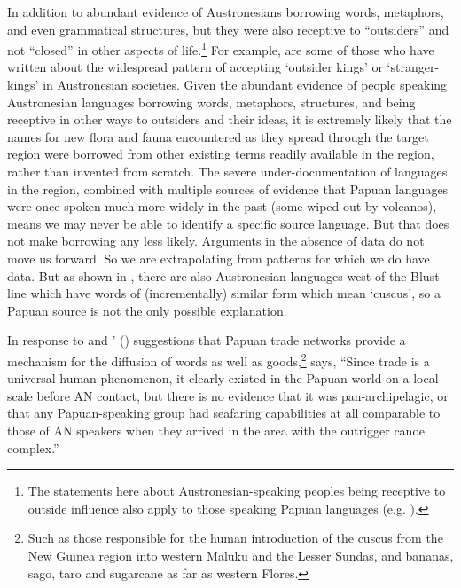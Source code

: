 In addition to abundant evidence of Austronesians borrowing
words, metaphors, and even grammatical structures,
but they were also receptive to ``outsiders''
and not ``closed'' in other aspects of life.\footnote{
		The statements here about Austronesian-speaking peoples
		being receptive to outside influence also apply to those
		speaking Papuan languages (e.g. \citealp{Schapper2011-BunakHistory}).}
For example,
\citet{Sahlins1985,Sahlins2008,Fox1995,Grimes2006,Haegerdal2008}
are some of those who have written about the
widespread pattern of accepting ‘outsider kings’
or ‘stranger-kings’ in Austronesian societies.
Given the abundant evidence of people speaking Austronesian languages
borrowing words, metaphors, structures, and being receptive in other ways to outsiders
and their ideas, it is extremely likely that the names for new
flora and fauna encountered as they spread through the target region
were borrowed from other existing terms readily available in
the region, rather than invented from scratch.
The severe under-documentation of languages in the region,
combined with multiple sources of evidence that Papuan languages were once
spoken much more widely in the past (some wiped out by volcanos),
means we may never be able to identify a specific source language.
But that does not make borrowing any less likely.
Arguments in the absence of data do not move us forward.
So we are extrapolating from patterns for which we do have data.
But as shown in ,
there are also Austronesian languages west of the Blust line
which have words of (incrementally) similar form which mean ‘cuscus’,
so a Papuan source is not the only possible explanation.

In response to \citet{Schapper2011}
and \citeauthor{DonohueGrimes2008}' (\citeyear{DonohueGrimes2008}) suggestions that Papuan trade
networks provide a mechanism for the diffusion of words as well
as goods,\footnote{
		Such as those responsible for the human introduction
		of the cuscus from the New Guinea region into western Maluku
		and the Lesser Sundas,
		and bananas, sago, taro and sugarcane as far as western Flores.}
 \citet[274]{Blust2012b} says,
“Since trade is a universal human phenomenon,
it clearly existed in the Papuan world on a local scale before
AN contact, but there is no evidence that it was pan-archipelagic,
or that any Papuan-speaking group had seafaring capabilities
at all comparable to those of AN speakers when they arrived in
the area with the outrigger canoe complex.”

